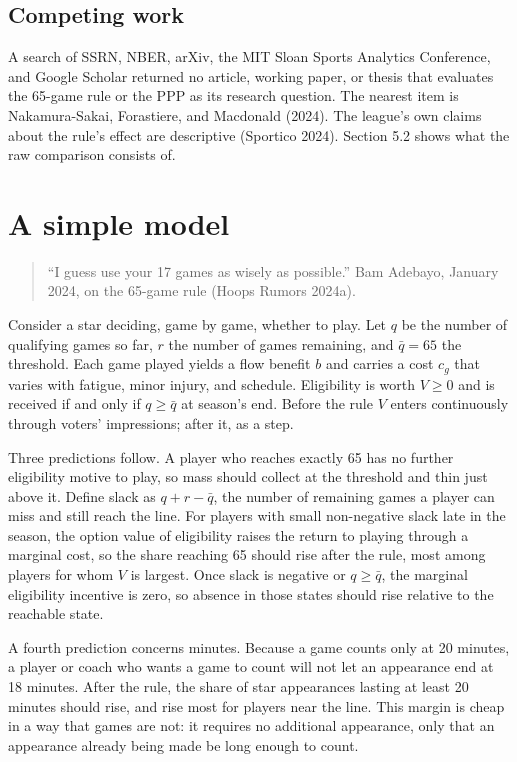 \documentclass[11pt]{article}
\begin{document}
\subsection*{Competing work}


A search of SSRN, NBER, arXiv, the MIT Sloan Sports Analytics Conference, and Google Scholar returned no article, working paper, or thesis that evaluates the 65-game rule or the PPP as its research question. The nearest item is Nakamura-Sakai, Forastiere, and Macdonald (2024). The league's own claims about the rule's effect are descriptive (Sportico 2024). Section 5.2 shows what the raw comparison consists of.


\section{A simple model}


\begin{quote}
``I guess use your 17 games as wisely as possible.'' Bam Adebayo, January 2024, on the 65-game rule (Hoops Rumors 2024a).
\end{quote}


Consider a star deciding, game by game, whether to play. Let $q$ be the number of qualifying games so far, $r$ the number of games remaining, and $\bar q = 65$ the threshold. Each game played yields a flow benefit $b$ and carries a cost $c_g$ that varies with fatigue, minor injury, and schedule. Eligibility is worth $V \geq 0$ and is received if and only if $q \geq \bar q$ at season's end. Before the rule $V$ enters continuously through voters' impressions; after it, as a step.

Three predictions follow. A player who reaches exactly 65 has no further eligibility motive to play, so mass should collect at the threshold and thin just above it. Define slack as $q + r - \bar q$, the number of remaining games a player can miss and still reach the line. For players with small non-negative slack late in the season, the option value of eligibility raises the return to playing through a marginal cost, so the share reaching 65 should rise after the rule, most among players for whom $V$ is largest. Once slack is negative or $q \geq \bar q$, the marginal eligibility incentive is zero, so absence in those states should rise relative to the reachable state.

A fourth prediction concerns minutes. Because a game counts only at 20 minutes, a player or coach who wants a game to count will not let an appearance end at 18 minutes. After the rule, the share of star appearances lasting at least 20 minutes should rise, and rise most for players near the line. This margin is cheap in a way that games are not: it requires no additional appearance, only that an appearance already being made be long enough to count.
\end{document}
